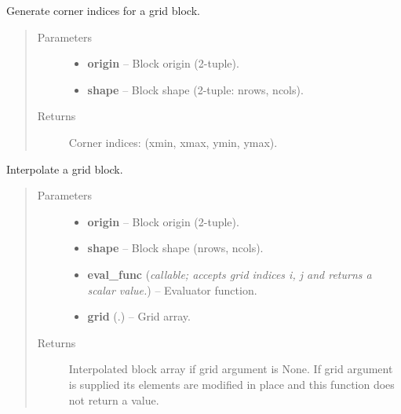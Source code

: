 \documentclass[letterpaper,10pt,english]{sphinxmanual}
\begin{document}

\begin{fulllineitems}
\label{docs/utilities:blrb.indices}
Generate corner indices for a grid block.
\begin{quote}\begin{description}
\item[{Parameters}] \leavevmode\begin{itemize}
\item {} 
\textbf{origin} -- Block origin (2-tuple).

\item {} 
\textbf{shape} -- Block shape (2-tuple: nrows, ncols).

\end{itemize}

\item[{Returns}] \leavevmode
Corner indices: (xmin, xmax, ymin, ymax).

\end{description}\end{quote}

\end{fulllineitems}



\begin{fulllineitems}
\label{docs/utilities:blrb.interpolate_block}
Interpolate a grid block.
\begin{quote}\begin{description}
\item[{Parameters}] \leavevmode\begin{itemize}
\item {} 
\textbf{origin} -- Block origin (2-tuple).

\item {} 
\textbf{shape} -- Block shape (nrows, ncols).

\item {} 
\textbf{eval\_func} (\emph{callable; accepts grid indices i, j and returns a scalar value.}) -- Evaluator function.

\item {} 
\textbf{grid} (.) -- Grid array.

\end{itemize}

\item[{Returns}] \leavevmode
Interpolated block array if grid argument is None. If grid argument
is supplied its elements are modified in place and this function
does not return a value.

\end{description}\end{quote}

\end{fulllineitems}
\end{document}
